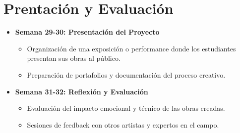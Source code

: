 \newpage
\section{Prentación y Evaluación}
\begin{itemize}
  \item \textbf{Semana 29-30: Presentación del Proyecto}
  \begin{itemize}
    \item Organización de una exposición o performance donde los estudiantes presentan sus obras al público.
    \item Preparación de portafolios y documentación del proceso creativo.
  \end{itemize}
  \item \textbf{Semana 31-32: Reflexión y Evaluación}
  \begin{itemize}
    \item Evaluación del impacto emocional y técnico de las obras creadas.
    \item Sesiones de feedback con otros artistas y expertos en el campo.
  \end{itemize}
\end{itemize}

